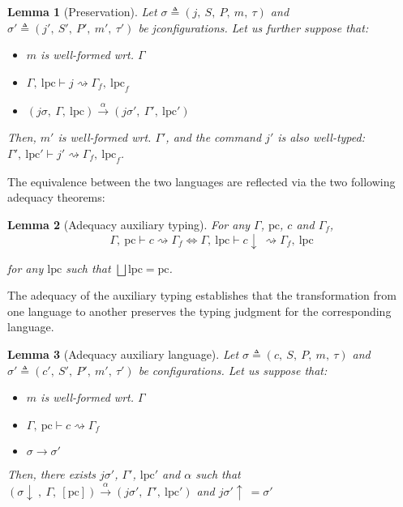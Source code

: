 \documentclass[10pt]{article}
\newcommand{\pc}{\mathrm{pc}}
\newcommand{\lpc}{\mathrm{lpc}}
\newcommand{\ctx}{\Gamma}
\newcommand{\conf}{\sigma}
\newcommand{\typing}[4]{ #1,~#2 \vdash #3 \rightsquigarrow #4}
\newcommand{\typingaux}[5]{ #1,~#2 \vdash #3 \rightsquigarrow #4,~#5}
\newcommand{\execaux}[7] { (#1,~#2,~#3) \xrightarrow{#4} (#5,~#6,~#7) }
\newcommand{\exec}[2] { #1 \rightarrow #2 }
\newcommand{\whilelang}{\textsc{While Lang} }
\newcommand{\compile}[1]{#1\!\downarrow\ }
\newcommand{\uncompile}[1]{#1\!\uparrow\ }
\newtheorem{lemma}{Lemma}
\begin{document}
\begin{lemma}[Preservation]\label{thm:preservation}
  Let $\conf \triangleq (j,~S,~P,~m,~\tau)$ and
  $\conf' \triangleq (j',~S',~P',~m',~\tau')$ be jconfigurations.
  Let us further suppose that:
  \begin{itemize}
    \item $m$ is well-formed wrt. $\ctx$
    \item $\typingaux{\ctx}{\lpc}{j}{\ctx_{f}}{\lpc_{f}}$
    \item \( \execaux{j\conf}{\ctx}{\lpc}{\alpha}{j\conf'}{\ctx'}{\lpc'} \)
  \end{itemize}

  Then, $m'$ is well-formed wrt. $\ctx'$, and the command $j'$ is also well-typed:
  $\typingaux{\ctx'}{\lpc'}{j'}{\ctx_{f}}{\lpc_{f}}$.
\end{lemma}


The equivalence between the two languages are reflected via the two following adequacy theorems:

\begin{lemma}[Adequacy auxiliary typing]
  For any $\ctx$, $\pc$, $c$ and $\ctx_{f}$,
  \[
  \typing{\ctx}{\pc}{c}{\ctx_{f}}
  \iff
    \typingaux{\ctx}{\lpc}{\compile{c}}{\ctx_{f}}{\lpc}
  \]

  for any \( \lpc \) such that \( \bigsqcup\lpc = \pc \).
\end{lemma}

The adequacy of the auxiliary typing establishes that the transformation from one language to
another preserves the typing judgment for the corresponding language.

\begin{lemma}[Adequacy auxiliary language]
  Let $\conf \triangleq (c,~S,~P,~m,~\tau)$ and
  $\conf' \triangleq (c',~S',~P',~m',~\tau')$ be configurations.
  Let us suppose that:
  \begin{itemize}
    \item $m$ is well-formed wrt. $\ctx$
    \item $\typing{\ctx}{\pc}{c}{\ctx_{f}}$
    \item $\exec{\conf}{\conf'}$
  \end{itemize}

  Then, there exists $j\conf'$, $\ctx'$, $\lpc'$ and $\alpha$ such that
  \( \execaux{\compile{\conf}}{\ctx}{[\pc]}{\alpha}{j\conf'}{\ctx'}{\lpc'} \) and \( \uncompile{j\conf'}=\conf' \)
\end{lemma}
\end{document}
